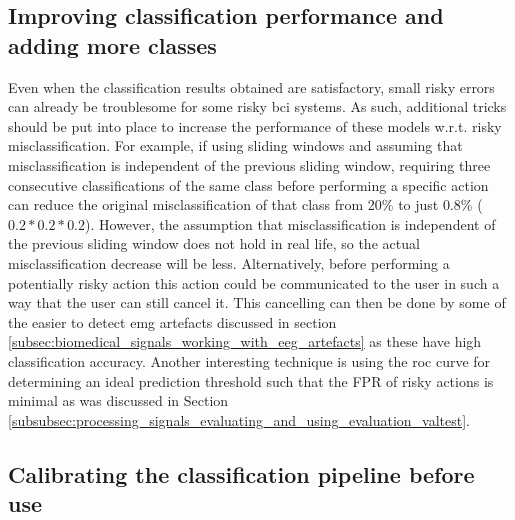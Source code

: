 
\subsection{Improving classification performance and adding more classes}
\label{subsec:online_bci_system_different_common_steps_better_classi} 


Even when the classification results obtained are satisfactory, small risky errors can already be troublesome for some risky \gls{bci} systems.
As such, additional tricks should be put into place to increase the performance of these models w.r.t. risky misclassification.
For example, if using sliding windows and assuming that misclassification is independent of the previous sliding window, requiring three consecutive classifications of the same class before performing a specific action can reduce the original misclassification of that class from 20\% to just 0.8\% ($0.2*0.2*0.2$).
However, the assumption that misclassification is independent of the previous sliding window does not hold in real life, so the actual misclassification decrease will be less.
Alternatively, before performing a potentially risky action this action could be communicated to the user in such a way that the user can still cancel it.
This cancelling can then be done by some of the easier to detect \gls{emg} artefacts discussed in section \ref{subsec:biomedical_signals_working_with_eeg_artefacts} as these have high classification accuracy.
Another interesting technique is using the \gls{roc} curve for determining an ideal prediction threshold such that the FPR of risky actions is minimal as was discussed in Section \ref{subsubsec:processing_signals_evaluating_and_using_evaluation_valtest}.


\subsection{Calibrating the classification pipeline before use}
\label{subsec:online_bci_system_different_common_steps_calibration} 

